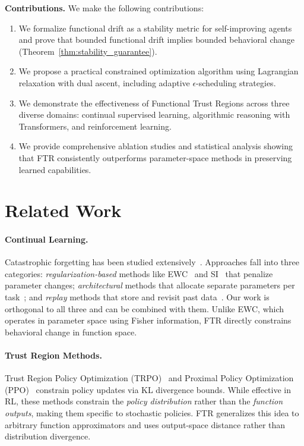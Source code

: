\documentclass{article}
\begin{document}
\textbf{Contributions.} We make the following contributions:
\begin{enumerate}
    \item We formalize functional drift as a stability metric for self-improving agents and prove that bounded functional drift implies bounded behavioral change (Theorem~\ref{thm:stability_guarantee}).
    \item We propose a practical constrained optimization algorithm using Lagrangian relaxation with dual ascent, including adaptive $\epsilon$-scheduling strategies.
    \item We demonstrate the effectiveness of Functional Trust Regions across three diverse domains: continual supervised learning, algorithmic reasoning with Transformers, and reinforcement learning.
    \item We provide comprehensive ablation studies and statistical analysis showing that FTR consistently outperforms parameter-space methods in preserving learned capabilities.
\end{enumerate}


\section{Related Work}

\paragraph{Continual Learning.}
Catastrophic forgetting has been studied extensively~\citep{mccloskey1989catastrophic,french1999catastrophic}. Approaches fall into three categories: \emph{regularization-based} methods like EWC~\citep{kirkpatrick2017overcoming} and SI~\citep{zenke2017continual} that penalize parameter changes; \emph{architectural} methods that allocate separate parameters per task~\citep{rusu2016progressive}; and \emph{replay} methods that store and revisit past data~\citep{rebuffi2017icarl}. Our work is orthogonal to all three and can be combined with them. Unlike EWC, which operates in parameter space using Fisher information, FTR directly constrains behavioral change in function space.

\paragraph{Trust Region Methods.}
Trust Region Policy Optimization (TRPO)~\citep{schulman2015trust} and Proximal Policy Optimization (PPO)~\citep{schulman2017proximal} constrain policy updates via KL divergence bounds. While effective in RL, these methods constrain the \emph{policy distribution} rather than the \emph{function outputs}, making them specific to stochastic policies. FTR generalizes this idea to arbitrary function approximators and uses output-space distance rather than distribution divergence.
\end{document}
